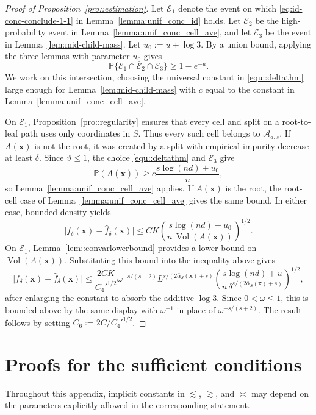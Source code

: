 \documentclass[11pt]{article}
\theoremstyle{plain}
\theoremstyle{definition}
\theoremstyle{remark}
\theoremstyle{plain}
\newcommand{\bx}{\mathbf{x}}
\renewcommand{\P}{\mathbb{P}}
\DeclareMathOperator{\Vol}{Vol}
\newcommand{\1}{\mathbbm{1}}
\begin{document}
\begin{proof}[Proof of Proposition~\ref{pro::estimation}]
Let $\mathcal{E}_1$ denote the event on which 
\eqref{eq:id-conc-conclude-1-1} in 
Lemma~\ref{lemma:unif_conc_id} holds.
Let $\mathcal{E}_2$ be the high-probability event in
Lemma~\ref{lemma:unif_conc_cell_ave}, and let $\mathcal E_3$ be
the event in Lemma~\ref{lem:mid-child-mass}. Let $u_0:=u+\log 3$.
By a union bound, applying the three lemmas with parameter $u_0$ gives
\[
\P\{\mathcal{E}_1\cap\mathcal{E}_2\cap\mathcal E_3\}
\ge 1-e^{-u}.
\]
We work on this intersection, choosing the universal constant in
\eqref{equ::deltathm} large enough for Lemma~\ref{lem:mid-child-mass}
with $c$ equal to the constant in
Lemma~\ref{lemma:unif_conc_cell_ave}.

On $\mathcal E_1$, Proposition~\ref{pro::regularity} ensures that every
cell and split on a root-to-leaf path uses only coordinates in $S$.
Thus every such cell belongs to $\mathcal A_{d,s}$. If $A(\bx)$ is not
the root, it was created by a split with empirical impurity decrease at
least $\delta$. Since $\vartheta\le1$, the choice
\eqref{equ::deltathm} and $\mathcal E_3$ give
\[
\P(A(\bx))\ge c\frac{s\log(nd)+u_0}{n},
\]
so Lemma~\ref{lemma:unif_conc_cell_ave} applies. If $A(\bx)$ is the
root, the root-cell case of Lemma~\ref{lemma:unif_conc_cell_ave} gives
the same bound. In either case, bounded density yields
\[
\bigl|f_\delta(\bx) - \hat{f}_{\delta}(\bx)\bigr|
\le 
C K\left(\frac{s\log(nd)+u_0}{n\,\Vol(A(\bx))}\right)^{1/2}.
\]
On $\mathcal{E}_1$, Lemma~\ref{lem::convarlowerbound} provides a lower bound on $\Vol(A(\bx))$. 
Substituting this bound into the inequality above gives
\[
	\bigl|f_\delta(\bx) - \hat{f}_{\delta}(\bx)\bigr|
	\le 
		\frac{2C K}{C_4'^{1/2}}
	\omega^{-s/(s+2)}
	L^{s/(2\bar\alpha_S(\bx)+s)}
	\left(\frac{s\log(nd)+u}{n\,\delta^{s/(2\bar\alpha_S(\bx)+s)}}\right)^{1/2},
\]
after enlarging the constant to absorb the additive $\log 3$.
Since $0<\omega\le1$, this is bounded above by the same display with $\omega^{-1}$ in place of $\omega^{-s/(s+2)}$.
The result follows by setting $C_6 := 2C/C_4'^{1/2}$.
\end{proof}

\section{Proofs for the sufficient conditions}
\label{app:sufficient-condition-proofs}

Throughout this appendix, implicit constants in $\lesssim$, $\gtrsim$, and $\asymp$ may depend on the parameters explicitly allowed in the corresponding statement.
\end{document}
